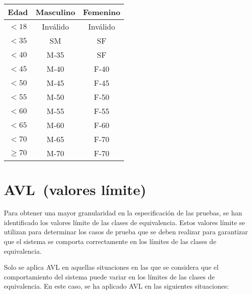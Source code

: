\begin{table}[ht]
	\centering
	\begin{tabular}{|c|c|c|}
		\hline
		\textbf{Edad} & \textbf{Masculino} & \textbf{Femenino} \\
		\hline
		\hline
		$<18$ & Inválido \cellcolor{red!25} & Inválido \cellcolor{red!25} \\
		$<35$ & SM & SF \\
		$<40$ & M-35 & SF \\
		$<45$ & M-40 & F-40 \\
		$<50$ & M-45 & F-45 \\
		$<55$ & M-50 & F-50 \\
		$<60$ & M-55 & F-55 \\
		$<65$ & M-60 & F-60 \\
		$<70$ & M-65 & F-70 \\
		$\geq 70$ & M-70 & F-70 \\
		\hline
	\end{tabular}
\end{table}

\section{AVL~(valores límite)}
Para obtener una mayor granularidad en la especificación de las pruebas, se han identificado
los valores límite de las clases de equivalencia. Estos valores límite se utilizan para
determinar los casos de prueba que se deben realizar para garantizar que el sistema se
comporta correctamente en los límites de las clases de equivalencia.

Solo se aplica AVL en aquellas situaciones en las que se considera que el comportamiento del
sistema puede variar en los límites de las clases de equivalencia. En este caso, se ha aplicado
AVL en las siguientes situaciones:

